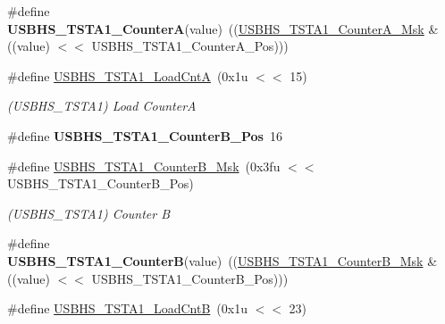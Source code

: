 \begin{DoxyCompactItemize}
\mbox{\label{group__SAMV71__USBHS_ga5171639f6b9651d60afb92e5237a1962}} 
\#define {\bfseries U\+S\+B\+H\+S\+\_\+\+T\+S\+T\+A1\+\_\+\+CounterA}(value)~((\mbox{\hyperlink{group__SAMV71__USBHS_ga1de9d7ed6010ea0e25fb96344c926a3c}{U\+S\+B\+H\+S\+\_\+\+T\+S\+T\+A1\+\_\+\+Counter\+A\+\_\+\+Msk}} \& ((value) $<$$<$ U\+S\+B\+H\+S\+\_\+\+T\+S\+T\+A1\+\_\+\+Counter\+A\+\_\+\+Pos)))
\item 
\mbox{\label{group__SAMV71__USBHS_ga248a94d9f9e0cf59cf2fde47733220c1}} 
\#define \mbox{\hyperlink{group__SAMV71__USBHS_ga248a94d9f9e0cf59cf2fde47733220c1}{U\+S\+B\+H\+S\+\_\+\+T\+S\+T\+A1\+\_\+\+Load\+CntA}}~(0x1u $<$$<$ 15)
\begin{DoxyCompactList}\small\item\em (U\+S\+B\+H\+S\+\_\+\+T\+S\+T\+A1) Load CounterA \end{DoxyCompactList}\item 
\mbox{\label{group__SAMV71__USBHS_ga071ed34f9feda0ff03dadb5d2ee74635}} 
\#define {\bfseries U\+S\+B\+H\+S\+\_\+\+T\+S\+T\+A1\+\_\+\+Counter\+B\+\_\+\+Pos}~16
\item 
\mbox{\label{group__SAMV71__USBHS_ga4a62a489cca8f4f52dd58b6d032bd29e}} 
\#define \mbox{\hyperlink{group__SAMV71__USBHS_ga4a62a489cca8f4f52dd58b6d032bd29e}{U\+S\+B\+H\+S\+\_\+\+T\+S\+T\+A1\+\_\+\+Counter\+B\+\_\+\+Msk}}~(0x3fu $<$$<$ U\+S\+B\+H\+S\+\_\+\+T\+S\+T\+A1\+\_\+\+Counter\+B\+\_\+\+Pos)
\begin{DoxyCompactList}\small\item\em (U\+S\+B\+H\+S\+\_\+\+T\+S\+T\+A1) Counter B \end{DoxyCompactList}\item 
\mbox{\label{group__SAMV71__USBHS_gae0811ced00d5cac3090d4d20c1bbf816}} 
\#define {\bfseries U\+S\+B\+H\+S\+\_\+\+T\+S\+T\+A1\+\_\+\+CounterB}(value)~((\mbox{\hyperlink{group__SAMV71__USBHS_ga4a62a489cca8f4f52dd58b6d032bd29e}{U\+S\+B\+H\+S\+\_\+\+T\+S\+T\+A1\+\_\+\+Counter\+B\+\_\+\+Msk}} \& ((value) $<$$<$ U\+S\+B\+H\+S\+\_\+\+T\+S\+T\+A1\+\_\+\+Counter\+B\+\_\+\+Pos)))
\item 
\mbox{\label{group__SAMV71__USBHS_gac3940be2859c64ea26da4b9dee92f80a}} 
\#define \mbox{\hyperlink{group__SAMV71__USBHS_gac3940be2859c64ea26da4b9dee92f80a}{U\+S\+B\+H\+S\+\_\+\+T\+S\+T\+A1\+\_\+\+Load\+CntB}}~(0x1u $<$$<$ 23)
$$
\end{DoxyCompactItemize}
